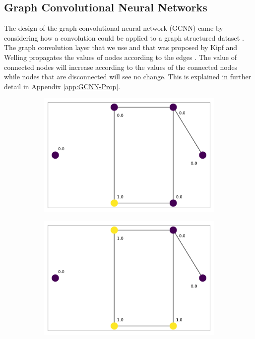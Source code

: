 \documentclass[thesis.tex]{subfiles}
\begin{document}
\subsection{Graph Convolutional Neural Networks}\label{subsec:GCNN}
The design of the graph convolutional neural network (GCNN) came by considering how a convolution could be applied to a graph structured dataset \cite{GCNN_Kipf}.
The graph convolution layer that we use and that was proposed by Kipf and Welling propagates the values of nodes according to the edges \cite{GCNN_Kipf}.
The value of connected nodes will increase according to the values of the connected nodes while nodes that are disconnected will see no change.
This is explained in further detail in Appendix \ref{app:GCNN-Prop}.
\begin{figure}[t]
	\centering
	\begin{subfigure}{0.45\textwidth}
		\includegraphics[width=\textwidth]{figures/graph_signal-00.pdf}
		\caption{}
		\label{fig:prop-ex-0}
	\end{subfigure}
	\begin{subfigure}{0.45\textwidth}
		\includegraphics[width=\textwidth]{figures/graph_signal-01.pdf}

\end{subfigure}
\end{figure}
\end{document}
